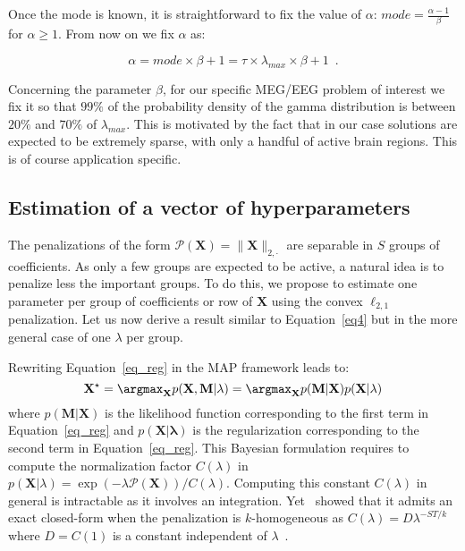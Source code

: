 Once the mode is known, it is straightforward to fix the value of $\alpha$: $mode =\frac{\alpha - 1}{\beta}$ for $\alpha \ge 1$. From now on we fix $\alpha$ as:

\begin{equation}
\alpha = mode \times \beta + 1 = \tau\times \lambda_{max} \times \beta + 1 \enspace .
\end{equation}

Concerning the parameter $\beta$, for our specific MEG/EEG problem of interest we fix it so that $99\%$ of the probability density of the gamma distribution is between $20\%$ and $70\%$ of $\lambda_{max}$. This is motivated by the fact that in our case solutions are expected to be extremely sparse, with only a handful of active brain regions. This is of course application specific.
 
\subsection{Estimation of a vector of hyperparameters}

The penalizations of the form $\mathcal{P}(\mathbf{X})=\|\mathbf{X}\|_{2,\cdot}$ are separable in $S$ groups of coefficients.
As only a few groups are expected to be active, a natural idea is to penalize less the important groups. To do this, we propose to estimate one parameter per group of coefficients or row of $\mathbf{X}$ using the convex $\ell_{2,1}$ penalization. Let us now derive a result similar to Equation~\eqref{eq4} but in the more general case of one $\lambda$ per group.

Rewriting Equation~\eqref{eq_reg} in the MAP framework leads to: 
\begin{equation}
\mathbf{X}^\star = \argmax_{\mathbf{X}}
p(\mathbf{X}, \mathbf{M}|\lambda) = \argmax_{\mathbf{X}} p(\mathbf{M}|\mathbf{X})p(\mathbf{X}|\lambda) 
\end{equation}
where $p(\mathbf{M}|\mathbf{X})$ is the likelihood function corresponding to the first term in Equation~\eqref{eq_reg} and $p(\mathbf{X|\lambda})$ is the regularization corresponding to the second term in Equation~\eqref{eq_reg}. This Bayesian formulation requires to compute the normalization factor $C(\lambda)$ in $p(\mathbf{X}|\lambda)=\exp(-\lambda\mathcal{P}(\mathbf{X}))/C(\lambda)$. Computing this constant $C(\lambda)$ in general is intractable as it involves an integration. Yet~\cite{Figueiredo} showed that it admits an exact closed-form when the penalization is $k$-homogeneous as $C(\lambda)=D\lambda^{-ST/k}$ where $D=C(1)$ is a constant independent of $\lambda$~\cite{Figueiredo}.\\


